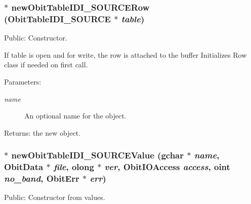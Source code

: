 \subsubsection{$\ast$ new\-Obit\-Table\-IDI\_\-SOURCERow ({\bf Obit\-Table\-IDI\_\-SOURCE} $\ast$ {\em table})}\label{ObitTableIDI__SOURCE_8h_a8}


Public: Constructor. 

If table is open and for write, the row is attached to the buffer Initializes Row class if needed on first call. \begin{Desc}
\item[Parameters:]
\begin{description}
\item[{\em name}]An optional name for the object. \end{description}
\end{Desc}
\begin{Desc}
\item[Returns:]the new object. \end{Desc}
\subsubsection{$\ast$ new\-Obit\-Table\-IDI\_\-SOURCEValue (gchar $\ast$ {\em name}, {\bf Obit\-Data} $\ast$ {\em file}, {\bf olong} $\ast$ {\em ver}, Obit\-IOAccess {\em access}, {\bf oint} {\em no\_\-band}, {\bf Obit\-Err} $\ast$ {\em err})}\label{ObitTableIDI__SOURCE_8h_a12}


Public: Constructor from values. 


